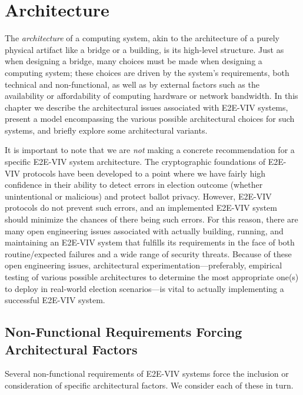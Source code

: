 \chapter{Architecture}
\label{chapter:architecture}

\iftechreport

The \emph{architecture} of a computing system, akin to the
architecture of a purely physical artifact like a bridge or a
building, is its high-level structure. Just as when designing a
bridge, many choices must be made when designing a computing system;
these choices are driven by the system's requirements, both technical
and non-functional, as well as by external factors such as the
availability or affordability of computing hardware or network
bandwidth. In this chapter we describe the architectural issues
associated with E2E-VIV systems, present a model encompassing the
various possible architectural choices for such systems, and briefly
explore some architectural variants.

It is important to note that we are \emph{not} making a concrete
recommendation for a specific E2E-VIV system architecture. The
cryptographic foundations of E2E-VIV protocols have been developed to
a point where we have fairly high confidence in their ability to
detect errors in election outcome (whether unintentional or malicious)
and protect ballot privacy.  However, E2E-VIV protocols do not prevent
such errors, and an implemented E2E-VIV system should minimize the
chances of there being such errors. For this reason, there are many
open engineering issues associated with actually building, running,
and maintaining an E2E-VIV system that fulfills its requirements in
the face of both routine/expected failures and a wide range of
security threats. Because of these open engineering issues,
architectural experimentation---preferably, empirical testing of
various possible architectures to determine the most appropriate
one(s) to deploy in real-world election scenarios---is vital to
actually implementing a successful E2E-VIV system.

\section{Non-Functional Requirements Forcing Architectural Factors}

Several non-functional requirements of E2E-VIV systems force the
inclusion or consideration of specific architectural factors. We
consider each of these in turn.

